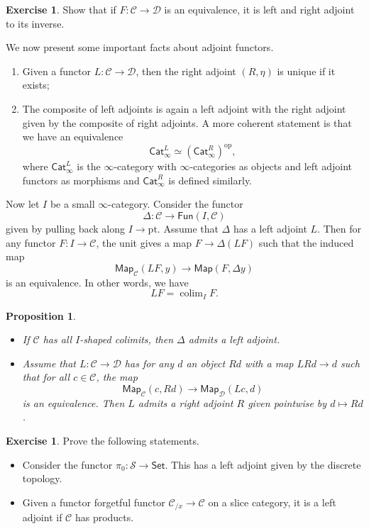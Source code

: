 \documentclass[10pt]{amsart}
\newtheorem{prop}[thm]{Proposition}
\theoremstyle{definition}
\newtheorem{exer}[thm]{Exercise}
\theoremstyle{remark}
\theoremstyle{plain}
\theoremstyle{definition}
\theoremstyle{remark}
\newcommand{\mc}[1]{\mathcal{#1}}
\newcommand{\mr}[1]{\mathrm{#1}}
\newcommand{\ms}[1]{\mathsf{#1}}
\newcommand{\1}{\mathbf{1}}
\newcommand{\2}{\mathbf{2}}
\newcommand{\3}{\mathbf{3}}
\DeclareMathOperator{\op}{op}
\DeclareMathOperator*{\colim}{colim}
\begin{document}
\begin{exer}
    Show that if $F \colon \mc{C} \to \mc{D}$ is an equivalence, it is left and right adjoint to its inverse.
\end{exer}

We now present some important facts about adjoint functors.
\begin{enumerate}
    \item Given a functor $L \colon \mc{C} \to \mc{D}$, then the right adjoint $(R, \eta)$ is unique if it exists;
    \item The composite of left adjoints is again a left adjoint with the right adjoint given by the composite of right adjoints. A more coherent statement is that we have an equivalence
    \[ \ms{Cat}_{\infty}^L \simeq (\ms{Cat}_{\infty}^R)^{\op}, \]
    where $\ms{Cat}_{\infty}^L$ is the $\infty$-category with $\infty$-categories as objects and left adjoint functors as morphisms and $\ms{Cat}_{\infty}^R$ is defined similarly.
\end{enumerate}

Now let $I$ be a small $\infty$-category. Consider the functor
\[ \Delta \colon \mc{C} \to \ms{Fun}(I, \mc{C}) \]
given by pulling back along $I \to \mr{pt}$. Assume that $\Delta$ has a left adjoint $L$. Then for any functor $F \colon I \to \mc{C}$, the unit gives a map $F \to \Delta(LF)$
such that the induced map
\[ \ms{Map}_{\mc{C}}(LF, y) \to \ms{Map}(F, \Delta y) \]
is an equivalence. In other words, we have
\[ LF = \colim_I F. \]

\begin{prop}\leavevmode
    \begin{itemize}
        \item If $\mc{C}$ has all $I$-shaped colimits, then $\Delta$ admits a left adjoint. 
        \item Assume that $L \colon \mc{C} \to \mc{D}$ has for any $d$ an object $Rd$ with a map $LRd \to d$ such that for all $c \in \mc{C}$, the map
        \[ \ms{Map}_{\mc{C}}(c, Rd) \to \ms{Map}_{\mc{D}}(Lc, d) \]
        is an equivalence. Then $L$ admits a right adjoint $R$ given pointwise by $d \mapsto Rd$.
    \end{itemize}
\end{prop}

\begin{exer}
    Prove the following statements.
    \begin{itemize}
        \item Consider the functor $\pi_0 \colon \mc{S} \to \ms{Set}$. This has a left adjoint given by the discrete topology.
        \item Given a functor forgetful functor $\mc{C}_{/x} \to \mc{C}$ on a slice category, it is a left adjoint if $\mc{C}$ has products.
    \end{itemize}
\end{exer}
\end{document}
